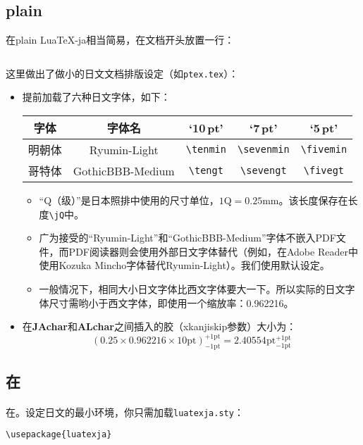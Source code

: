 \documentclass{ltjarticle}
\DeclareRobustCommand\LuaTeX{Lua\TeX}
\begin{document}
\subsection{plain }
在plain \LuaTeX-ja相当简易，在文档开头放置一行：
\begin{verbatim}

\end{verbatim}

这里做出了做小的日文文档排版设定（如\texttt{ptex.tex}）：
\begin{itemize}
\item 提前加载了六种日文字体，如下：
\begin{center}
\begin{tabular}{ccccc}
\toprule
\textbf{字体}&\textbf{字体名}&\bf `10\,pt'&\bf`7\,pt'&\bf`5\,pt'\\\midrule
明朝体&Ryumin-Light    &\verb+\tenmin+&\verb+\sevenmin+&\verb+\fivemin+\\
哥特体&GothicBBB-Medium&\verb+\tengt+ &\verb+\sevengt+ &\verb+\fivegt+\\
\bottomrule
\end{tabular}
\end{center}
	\begin{itemize}
	\item “Q（级）”是日本照排中使用的尺寸单位，$1 \mathrm{Q} = 0.25\mathrm{mm}$。该长度保存在长度\verb!\jQ!中。
	\item 广为接受的“Ryumin-Light”和“GothicBBB-Medium”字体不嵌入PDF文件，而PDF阅读器则会使用外部日文字体替代（例如，在Adobe Reader中使用Kozuka Mincho字体替代Ryumin-Light）。我们使用默认设定。
	\item 一般情况下，相同大小日文字体比西文字体要大一下。所以实际的日文字体尺寸需哟小于西文字体，即使用一个缩放率：0.962216。
	\end{itemize}
\item 在\textbf{JAchar}和\textbf{ALchar}之间插入的胶（\textsf{xkanjiskip}参数）大小为：
$$(0.25\times0.962216\times\mathrm{10pt})^{\mathrm{+1pt}}_{\mathrm{-1pt}} = 2.40554\mathrm{pt}^{\mathrm{+1pt}}_{\mathrm{-1pt}}$$
\end{itemize}
\subsection{在}
\paragraph{\LaTeXe} 在。设定日文的最小环境，你只需加载\texttt{luatexja.sty}：
\begin{verbatim}
\usepackage{luatexja}
\end{verbatim}
\end{document}
